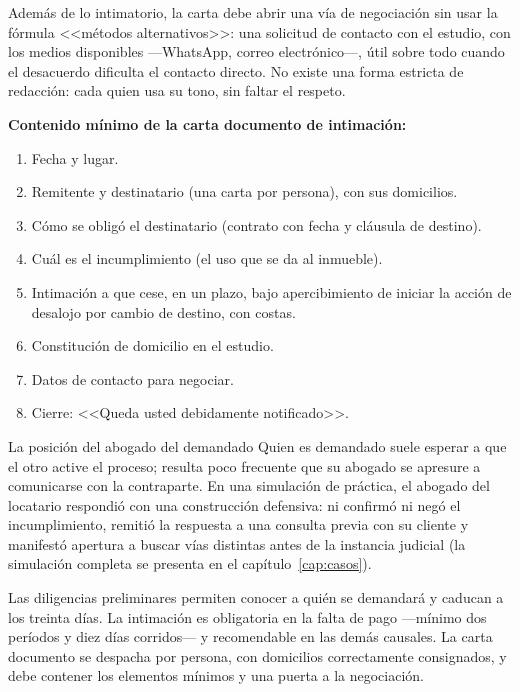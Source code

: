 \documentclass[12pt,oneside]{book}
\begin{document}
Además de lo intimatorio, la carta debe abrir una vía de negociación sin usar la fórmula <<métodos alternativos>>: una solicitud de contacto con el estudio, con los medios disponibles ---WhatsApp, correo electrónico---, útil sobre todo cuando el desacuerdo dificulta el contacto directo. No existe una forma estricta de redacción: cada quien usa su tono, sin faltar el respeto.

\begin{important}
\textbf{Contenido mínimo de la carta documento de intimación:}
\begin{enumerate}
\item Fecha y lugar.
\item Remitente y destinatario (una carta por persona), con sus domicilios.
\item Cómo se obligó el destinatario (contrato con fecha y cláusula de destino).
\item Cuál es el incumplimiento (el uso que se da al inmueble).
\item Intimación a que cese, en un plazo, bajo apercibimiento de iniciar la acción de desalojo por cambio de destino, con costas.
\item Constitución de domicilio en el estudio.
\item Datos de contacto para negociar.
\item Cierre: <<Queda usted debidamente notificado>>.
\end{enumerate}
\end{important}

\begin{example}{La posición del abogado del demandado}
Quien es demandado suele esperar a que el otro active el proceso; resulta poco frecuente que su abogado se apresure a comunicarse con la contraparte. En una simulación de práctica, el abogado del locatario respondió con una construcción defensiva: ni confirmó ni negó el incumplimiento, remitió la respuesta a una consulta previa con su cliente y manifestó apertura a buscar vías distintas antes de la instancia judicial (la simulación completa se presenta en el capítulo~\ref{cap:casos}).
\end{example}

\begin{sintesis}
Las diligencias preliminares permiten conocer a quién se demandará y caducan a los treinta días. La intimación es obligatoria en la falta de pago ---mínimo dos períodos y diez días corridos--- y recomendable en las demás causales. La carta documento se despacha por persona, con domicilios correctamente consignados, y debe contener los elementos mínimos y una puerta a la negociación.
\end{sintesis}
\end{document}
